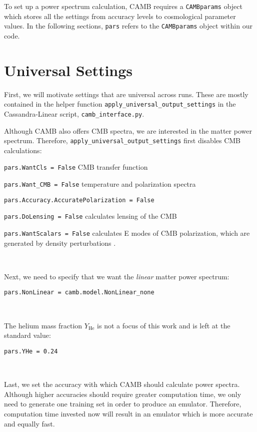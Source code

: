 
To set up a power spectrum calculation, CAMB requires a
\verb|CAMBparams| object which stores all the settings from accuracy levels
to cosmological parameter values. In the following sections, \verb|pars| 
refers to the \verb|CAMBparams| object within our code.

\section{Universal Settings}

First, we will motivate settings that are universal across runs. These are 
mostly 
contained in the helper function \verb|apply_universal_output_settings| in the 
Cassandra-Linear script, \verb|camb_interface.py|.

Although CAMB also offers CMB spectra, we are interested in the
matter power spectrum. Therefore, \verb|apply_universal_output_settings|  
first disables CMB calculations:

\verb|pars.WantCls = False| \quad CMB transfer function

\verb|pars.Want_CMB = False| \quad temperature and polarization spectra

\verb|pars.Accuracy.AccuratePolarization = False|

\verb|pars.DoLensing = False| \quad calculates lensing of the CMB

\verb|pars.WantScalars = False| \quad calculates E modes of CMB polarization, 
which are generated by density perturbations .

\

Next, we need to specify that we want the \textit{linear} matter power 
spectrum:

\verb|pars.NonLinear = camb.model.NonLinear_none|


\

The helium mass fraction $Y_\text{He}$ is not a focus of this work and is left
at the standard value:

\verb|pars.YHe = 0.24| \quad {}

\

Last, we set the accuracy with which CAMB should calculate power spectra.
Although higher accuracies should require greater computation time, we only
need to generate one training set in order to produce an emulator. Therefore,
computation time invested now will result in an emulator which is more
accurate and equally fast.


